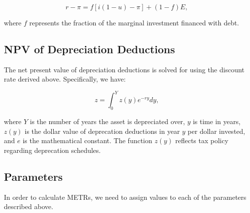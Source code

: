 \documentclass[article,11pt,letterpaper,fleqn]{article}
\theoremstyle{definition}
\numberwithin{equation}{section}
\begin{document}
\begin{equation}
r-\pi = f\left[i(1-u)-\pi\right] + (1-f)E,
\end{equation}

\noindent\noindent where $f$ represents the fraction of the marginal investment financed with debt.

\subsection{NPV of Depreciation Deductions}

The net present value of depreciation deductions is solved for using the discount rate derived above.  Specifically, we have: 

\begin{equation}
z = \int_{0}^{Y}z(y)e^{-ry}dy,
\end{equation}

\noindent\noindent where $Y$ is the number of years the asset is depreciated over, $y$ is time in years, $z(y)$ is the dollar value of deprecation deductions in year $y$ per dollar invested, and $e$ is the mathematical constant.  The function $z(y)$ reflects tax policy regarding deprecation schedules.  

\subsection{Parameters}

In order to calculate METRs, we need to assign values to each of the parameters described above.  


\end{document}
